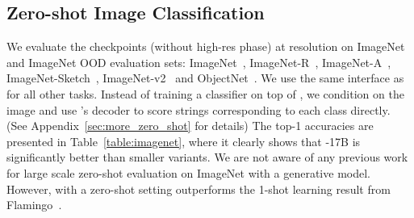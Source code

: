 \documentclass{article}
\begin{document}
\subsection{Zero-shot Image Classification}
We evaluate the \NAME checkpoints (without high-res phase) at  resolution on ImageNet and ImageNet OOD evaluation sets: ImageNet~\citep{deng2009imagenet}, \mbox{ImageNet-R}~\citep{hendrycks2021many}, \mbox{ImageNet-A}~\citep{hendrycks2021nae}, \mbox{ImageNet-Sketch}~\citep{wang2019learning}, \mbox{ImageNet-v2}~\citep{recht2019imagenet} and ObjectNet~\citep{objectnet}.
%
We use the same interface as for all other tasks.
Instead of training a classifier on top of \NAME, we condition on the image and use \NAME's decoder to score strings corresponding to each class directly. (See Appendix~\ref{sec:more_zero_shot} for details)
The top-1 accuracies are presented in Table~\ref{table:imagenet}, where it clearly shows that \NAME-17B is significantly better than smaller variants.
We are not aware of any previous work for large scale zero-shot evaluation on ImageNet with a generative model.
However, \NAME with a zero-shot setting outperforms the 1-shot learning result from Flamingo~\citep{flamingo}.
\begin{table}[ht!]
\caption{Top 1 accuracy results of 0-shot image classification on ImageNet, \mbox{ImageNet-R}, \mbox{ImageNet-A}, \mbox{ImageNet-Sketch}, \mbox{Imagenet-v2}, and ObjectNet. Top-5 results are in the Appendix (Table~\ref{table:imagenet_top5}).} 
\centering
{}
\label{table:imagenet}
\end{table}
\end{document}
